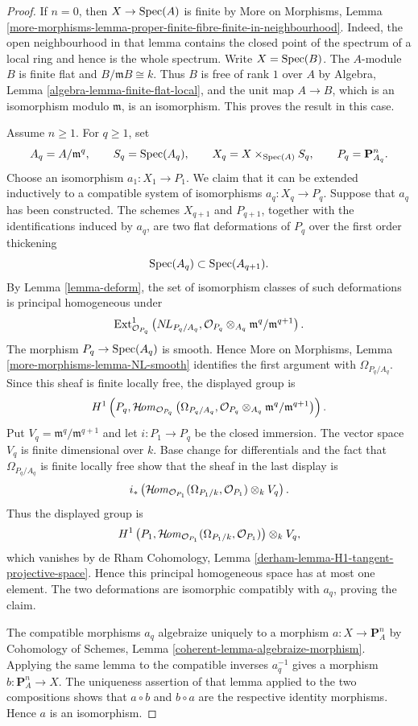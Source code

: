\begin{proof}
If $n = 0$, then $X \to \mathop{\mathrm{Spec}}(A)$ is finite by More on Morphisms,
Lemma
\ref{more-morphisms-lemma-proper-finite-fibre-finite-in-neighbourhood}.
Indeed, the open neighbourhood in that lemma contains the closed point of
the spectrum of a local ring and hence is the whole spectrum. Write
$X = \mathop{\mathrm{Spec}}(B)$. The $A$-module $B$ is finite flat and
$B/\mathfrak mB \cong k$. Thus $B$ is free of rank $1$ over $A$ by
Algebra, Lemma \ref{algebra-lemma-finite-flat-local}, and the unit map
$A \to B$, which is an isomorphism modulo $\mathfrak m$, is an
isomorphism. This proves the result in this case.

\medskip\noindent
Assume $n \geq 1$. For $q \geq 1$, set
$$
A_q = A/\mathfrak m^q, \qquad
S_q = \mathop{\mathrm{Spec}}(A_q), \qquad
X_q = X \times_{\mathop{\mathrm{Spec}}(A)} S_q, \qquad
P_q = \mathbf{P}^n_{A_q}.
$$
Choose an isomorphism $a_1 : X_1 \to P_1$. We claim that it can be
extended inductively to a compatible system of isomorphisms
$a_q : X_q \to P_q$. Suppose that $a_q$ has been constructed. The schemes
$X_{q + 1}$ and $P_{q + 1}$, together with the identifications induced by
$a_q$, are two flat deformations of $P_q$ over the first order thickening
$$
\mathop{\mathrm{Spec}}(A_q) \subset \mathop{\mathrm{Spec}}(A_{q + 1}).
$$
By Lemma \ref{lemma-deform}, the set of isomorphism classes of such
deformations is principal homogeneous under
$$
\mathop{\mathrm{Ext}}\nolimits^1_{\mathcal{O}_{P_q}}
\left(
\mathop{N\!L}\nolimits_{P_q/A_q},
\mathcal{O}_{P_q} \otimes_{A_q}
\mathfrak m^q/\mathfrak m^{q + 1}
\right).
$$
The morphism $P_q \to \mathop{\mathrm{Spec}}(A_q)$ is smooth. Hence More on Morphisms,
Lemma \ref{more-morphisms-lemma-NL-smooth} identifies the first argument
with $\Omega_{P_q/A_q}$. Since this sheaf is finite locally free, the
displayed group is
$$
H^1\left(P_q,
\mathop{\mathcal{H}\!\mathit{om}}\nolimits_{\mathcal{O}_{P_q}}
\left(\Omega_{P_q/A_q},
\mathcal{O}_{P_q} \otimes_{A_q}
\mathfrak m^q/\mathfrak m^{q + 1}\right)\right).
$$
Put $V_q = \mathfrak m^q/\mathfrak m^{q + 1}$ and let
$i : P_1 \to P_q$ be the closed immersion. The vector space $V_q$ is finite
dimensional over $k$. Base change for differentials and the fact that
$\Omega_{P_q/A_q}$ is finite locally free show that the sheaf in the last
display is
$$
i_*\left(
\mathop{\mathcal{H}\!\mathit{om}}\nolimits_{\mathcal{O}_{P_1}}
(\Omega_{P_1/k}, \mathcal{O}_{P_1}) \otimes_k V_q
\right).
$$
Thus the displayed group is
$$
H^1\left(P_1,
\mathop{\mathcal{H}\!\mathit{om}}\nolimits_{\mathcal{O}_{P_1}}
(\Omega_{P_1/k}, \mathcal{O}_{P_1})\right) \otimes_k V_q,
$$
which vanishes by de Rham Cohomology, Lemma
\ref{derham-lemma-H1-tangent-projective-space}. Hence this principal
homogeneous space has at most one element. The two deformations are
isomorphic compatibly with $a_q$, proving the claim.

The compatible morphisms $a_q$ algebraize uniquely to a morphism
$a : X \to \mathbf{P}^n_A$ by Cohomology of Schemes, Lemma
\ref{coherent-lemma-algebraize-morphism}. Applying the same lemma to the
compatible inverses $a_q^{-1}$ gives a morphism
$b : \mathbf{P}^n_A \to X$. The uniqueness assertion of that lemma applied
to the two compositions shows that $a \circ b$ and $b \circ a$ are the
respective identity morphisms. Hence $a$ is an isomorphism.
\end{proof}

